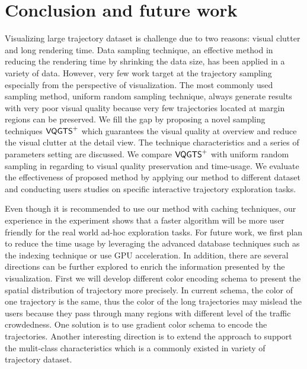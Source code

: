 \section{Conclusion and future work}\label{sec:con}

Visualizing large trajectory dataset is challenge due to two reasons: visual clutter and long rendering time.
Data sampling technique, an effective method in reducing the rendering time by shrinking the data size, has been applied in a variety of data.
However, very few work target at the trajectory sampling especially from the perspective of visualization.
The most commonly used sampling method, uniform random sampling technique, always generate results with very poor visual quality because very few trajectories located at margin regions can be preserved.
We fill the gap by proposing a novel sampling techniques $\mathsf{VQGTS}^{+}$ which guarantees the visual quality at overview and reduce the visual clutter at the detail view. The technique characteristics and a series of parameters setting are discussed.
We compare $\mathsf{VQGTS}^{+}$ with uniform random sampling in regarding to visual quality preservation and time-usage. We evaluate the effectiveness of proposed method by applying our method to different dataset and conducting users studies on specific interactive trajectory exploration tasks.


Even though it is recommended to use our method with caching techniques, our experience in the experiment shows that a faster algorithm will be more user friendly for the real world ad-hoc exploration tasks. For future work, we first plan to reduce the time usage by leveraging the advanced database techniques such as the indexing technique or use GPU acceleration.
In addition, there are several directions can be further explored to enrich the information presented by the visualization.
First we will develop different color encoding schema to present the spatial distribution of trajectory more precisely.
In current schema, the color of one trajectory is the same, thus the color of the long trajectories may mislead the users because they pass  through many regions with different level of the traffic crowdedness. One solution is to use gradient color schema to encode the trajectories.
Another interesting direction is to extend the approach to support the mulit-class characteristics which is a commonly existed in variety of trajectory dataset. 
